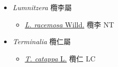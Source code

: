 
  \begin{itemize}
 \item[] \textit{Lumnitzera} 欖李屬
                                
  \begin{itemize}
        \item[] \href{http://www.theplantlist.org/tpl1.1/search?q=Lumnitzera+racemosa}{\textit{L. racemosa} Willd.}   欖李   NT
  \end{itemize}
 \item[] \textit{Terminalia} 欖仁屬
                                
  \begin{itemize}
        \item[] \href{http://www.theplantlist.org/tpl1.1/search?q=Terminalia+catappa}{\textit{T. catappa} L.}   欖仁   LC
  \end{itemize}
  \end{itemize}
